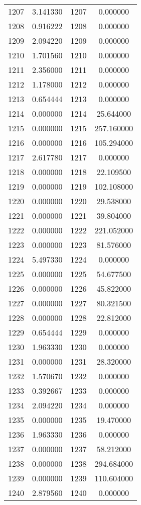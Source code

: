 \documentclass[12pt]{article}
\begin{document}
\begin{longtable}{@{}cccc@{}}
1207 & 3.141330 & 1207 & 0.000000 \\
1208 & 0.916222 & 1208 & 0.000000 \\
1209 & 2.094220 & 1209 & 0.000000 \\
1210 & 1.701560 & 1210 & 0.000000 \\
1211 & 2.356000 & 1211 & 0.000000 \\
1212 & 1.178000 & 1212 & 0.000000 \\
1213 & 0.654444 & 1213 & 0.000000 \\
1214 & 0.000000 & 1214 & 25.644000 \\
1215 & 0.000000 & 1215 & 257.160000 \\
1216 & 0.000000 & 1216 & 105.294000 \\
1217 & 2.617780 & 1217 & 0.000000 \\
1218 & 0.000000 & 1218 & 22.109500 \\
1219 & 0.000000 & 1219 & 102.108000 \\
1220 & 0.000000 & 1220 & 29.538000 \\
1221 & 0.000000 & 1221 & 39.804000 \\
1222 & 0.000000 & 1222 & 221.052000 \\
1223 & 0.000000 & 1223 & 81.576000 \\
1224 & 5.497330 & 1224 & 0.000000 \\
1225 & 0.000000 & 1225 & 54.677500 \\
1226 & 0.000000 & 1226 & 45.822000 \\
1227 & 0.000000 & 1227 & 80.321500 \\
1228 & 0.000000 & 1228 & 22.812000 \\
1229 & 0.654444 & 1229 & 0.000000 \\
1230 & 1.963330 & 1230 & 0.000000 \\
1231 & 0.000000 & 1231 & 28.320000 \\
1232 & 1.570670 & 1232 & 0.000000 \\
1233 & 0.392667 & 1233 & 0.000000 \\
1234 & 2.094220 & 1234 & 0.000000 \\
1235 & 0.000000 & 1235 & 19.470000 \\
1236 & 1.963330 & 1236 & 0.000000 \\
1237 & 0.000000 & 1237 & 58.212000 \\
1238 & 0.000000 & 1238 & 294.684000 \\
1239 & 0.000000 & 1239 & 110.604000 \\
1240 & 2.879560 & 1240 & 0.000000 \\

\end{longtable}
\end{document}
